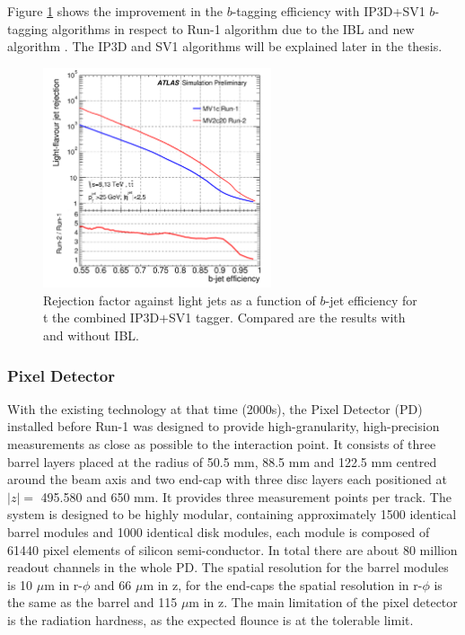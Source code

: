 Figure \ref{fig:chap2:ATLAS:ITK:IBL:Btag} shows the improvement in the $b$-tagging efficiency with IP3D+SV1 $b$-tagging algorithms in respect to Run-1 algorithm due to the IBL and new algorithm \cite{IBL_Btag, IBL_Btag2}. The IP3D and SV1 algorithms will be explained later in the thesis.
\begin{figure}[htbp]
    \centering
    \includegraphics[width=0.6\textwidth]{Ch2/Img/IBL_btag2.png}
    \caption{Rejection factor against light jets as a function of $b$-jet efficiency for t the combined IP3D+SV1 tagger. Compared are the results with and without IBL.}
    \label{fig:chap2:ATLAS:ITK:IBL:Btag}
\end{figure}

\subsubsection{Pixel Detector}
\label{chap2:ATLAS:ITK:PD}
With the existing technology at that time (2000s), the Pixel Detector (PD) installed before Run-1 was designed to provide high-granularity, high-precision measurements as close as possible to the interaction point. It consists of three barrel layers placed at the radius of 50.5 mm, 88.5 mm and 122.5 mm centred around the beam axis and two end-cap with three disc layers each positioned at $|z|=$ 495.580 and 650 mm. It provides three measurement points per track. The system is designed to be highly modular, containing approximately 1500 identical barrel modules and 1000 identical disk modules, each module is composed of 61440 pixel elements of silicon semi-conductor. In total there are about 80 million readout channels in the whole PD. The spatial resolution for the barrel modules is 10 $\mu$m in r-$\phi$ and 66 $\mu$m in z, for the end-caps the spatial resolution in r-$\phi$ is the same as the barrel and 115 $\mu$m in z. The main limitation of the pixel detector is the radiation hardness, as the expected flounce is at the tolerable limit. 


